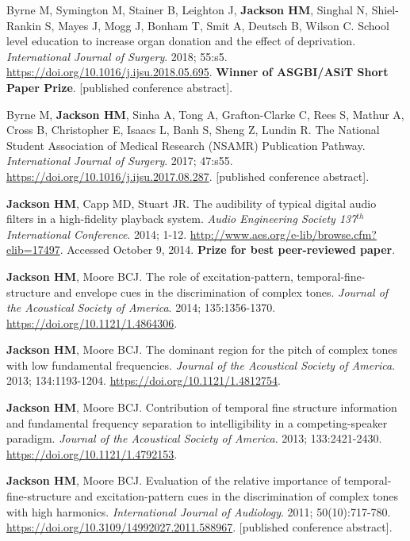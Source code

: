 \documentclass[a4paper, oneside, final, 11pt]{scrartcl} %
\begin{document}
Byrne M, Symington M, Stainer B, Leighton J, \textbf{Jackson HM}, Singhal N, Shiel-Rankin S, Mayes J, Mogg J, Bonham T, Smit A, Deutsch B, Wilson C. School level education to increase organ donation and the effect of deprivation. \textit{International Journal of Surgery}. 2018; 55:s5. \url{https://doi.org/10.1016/j.ijsu.2018.05.695}. \textbf{Winner of ASGBI/ASiT Short Paper Prize}. [published conference abstract].

\bigskip

Byrne M, \textbf{Jackson HM}, Sinha A, Tong A, Grafton-Clarke C, Rees S, Mathur A, Cross B, Christopher E, Isaacs L, Banh S, Sheng Z, Lundin R. The National Student Association of Medical Research (NSAMR) Publication Pathway. \textit{International Journal of Surgery}. 2017; 47:s55. \url{https://doi.org/10.1016/j.ijsu.2017.08.287}. [published conference abstract].

\bigskip

\textbf{Jackson HM}, Capp MD, Stuart JR. The audibility of typical digital audio filters in a high-fidelity playback system. \textit{Audio Engineering Society 137$^{th}$ International Conference}. 2014; 1-12. \url{http://www.aes.org/e-lib/browse.cfm?elib=17497}. Accessed October 9, 2014. \textbf{Prize for best peer-reviewed paper}.

\bigskip

\textbf{Jackson HM}, Moore BCJ. The role of excitation-pattern, temporal-fine-structure and envelope cues in the discrimination of complex tones. \textit{Journal of the Acoustical Society of America}. 2014; 135:1356-1370. \url{https://doi.org/10.1121/1.4864306}.


\bigskip
\textbf{Jackson HM}, Moore BCJ. The dominant region for the pitch of complex tones with low fundamental frequencies. \textit{Journal of the Acoustical Society of America}. 2013; 134:1193-1204. \url{https://doi.org/10.1121/1.4812754}.

\bigskip

\textbf{Jackson HM}, Moore BCJ. Contribution of temporal fine structure information and fundamental frequency separation to intelligibility in a competing-speaker paradigm. \textit{Journal of the Acoustical Society of America}. 2013; 133:2421-2430. \url{https://doi.org/10.1121/1.4792153}.

\bigskip

\textbf{Jackson HM}, Moore BCJ. Evaluation of the relative importance of temporal-fine-structure and excitation-pattern cues in the discrimination of complex tones with high harmonics. \textit{International Journal of Audiology}. 2011; 50(10):717-780. \url{https://doi.org/10.3109/14992027.2011.588967}. [published conference abstract].
\end{document}
